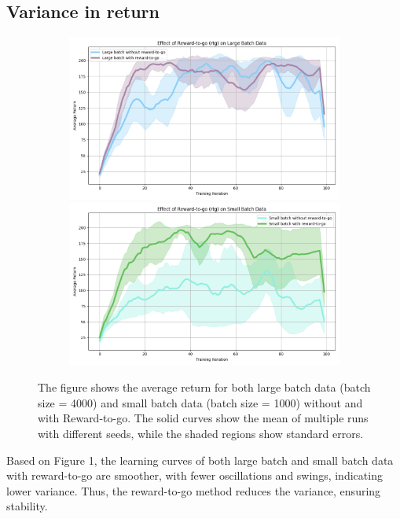 \documentclass{article} %
\begin{document}
\subsection{Variance in return}
\begin{figure}[htbp]
    \centering
    \begin{subfigure}{\textwidth}
        \centering
        \begin{minipage}{0.48\textwidth}
            \centering
            \includegraphics[width=\linewidth]{cartpole_comparison.png}
        \end{minipage}
        \hfill
        \begin{minipage}{0.48\textwidth}
            \centering
            \includegraphics[width=\linewidth]{cartpole_comparison_sb_rtg.png}
        \end{minipage}
    \end{subfigure}
    
    \vspace{0.5cm}
    
   
    \caption{The figure shows the average return for both large batch data (batch size = 4000) and small batch data (batch size = 1000) without and with Reward-to-go. The solid curves show the mean of multiple runs with different seeds, while the shaded regions show standard errors.}
    \label{fig:comparison}
\end{figure}
Based on Figure 1, the learning curves of both large batch and small batch data with reward-to-go are smoother, with fewer oscillations and swings, indicating lower variance. Thus, the reward-to-go method reduces the variance, ensuring stability.
\end{document}
